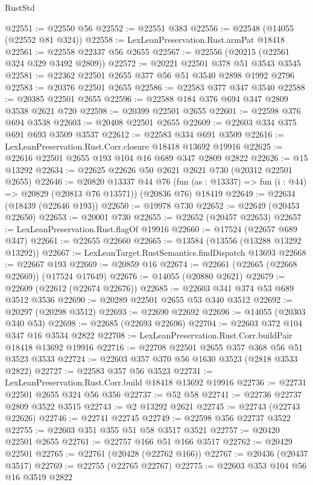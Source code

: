 \begin{lexlean}{RustStd}
\begin{coremodule}
@22551 := @22550 @56
@22552 := @22551 @383
@22556 := @22548 (@14055 (@22552 @81 @324))
@22558 := LexLeanPreservation.Rust.armPat @18418
@22561 := @22558 @22337 @56 @2655
@22567 := @22556 (@20215 (@22561 @324 @329 @3492 @2809))
@22572 := @20221 @22501 @378 @51 @3543 @3545
@22581 := @22362 @22501 @2655 @377 @56 @51 @3540 @2898 @1992 @2796
@22583 := @20376 @22501 @2655
@22586 := @22583 @377 @347 @3540
@22588 := @20385 @22501 @2655
@22596 := @22588 @184 @376 @694 @347 @2809 @3538 @2621 @720
@22598 := @20399 @22501 @2655
@22601 := @22598 @376 @694 @3538
@22603 := @20408 @22501 @2655
@22609 := @22603 @334 @375 @691 @693 @3509 @3537
@22612 := @22583 @334 @691 @3509
@22616 := LexLeanPreservation.Rust.Corr.closure @18418 @13692 @19916
@22625 := @22616 @22501 @2655 @193 @104 @16 @689 @347 @2809 @2822
@22626 := @15 @13292
@22634 := @22625 @22626 @50 @2621 @2621 @730 (@20312 @22501 @2655)
@22646 := @20820
    @13337
    @44
    @76
    (fun (as : @13337) => fun (i : @44) => @20829 (@20813 @76 @13571))
    (@20836 @76)
    @18419
@22649 := @22634 (@18439 (@22646 @193))
@22650 := @19978 @730
@22652 := @22649 (@20453 @22650)
@22653 := @20001 @730
@22655 := @22652 (@20457 @22653)
@22657 := LexLeanPreservation.Rust.flagOf @19916
@22660 := @17524 (@22657 @689 @347)
@22661 := @22655 @22660
@22665 := @13584 (@13556 (@13288 @13292 @13292))
@22667 := LexLeanTarget.RustSemantics.findDispatch @13693
@22668 := @22667 @193
@22669 := @20859 @16
@22674 := @22661 (@22665 (@22668 @22669)) (@17524 @17649)
@22676 := @14055 (@20880 @2621)
@22679 := @22609 (@22612 (@22674 @22676))
@22685 := @22603 @341 @374 @53 @689 @3512 @3536
@22690 := @20289 @22501 @2655 @53 @340 @3512
@22692 := @20297 (@20298 @3512)
@22693 := @22690 @22692
@22696 := @14055 (@20303 @340 @53)
@22698 := @22685 (@22693 @22696)
@22704 := @22603 @372 @104 @347 @16 @3534 @2822
@22708 := LexLeanPreservation.Rust.Corr.buildPair @18418 @13692 @19916
@22716 := @22708 @22501 @2655 @357 @368 @56 @51 @3523 @3533
@22724 := @22603 @357 @370 @56 @1630 @3523 (@2818 @3533 @2822)
@22727 := @22583 @357 @56 @3523
@22731 := LexLeanPreservation.Rust.Corr.build @18418 @13692 @19916
@22736 := @22731 @22501 @2655 @324 @56 @356
@22737 := @52 @58
@22741 := @22736 @22737 @2809 @3522 @3515
@22743 := @2 @13292 @2621
@22745 := @22743 (@22743 @22626)
@22746 := @22741 @22745
@22749 := @22598 @356 @22737 @3522
@22755 := @22603 @351 @355 @51 @58 @3517 @3521
@22757 := @20420 @22501 @2655
@22761 := @22757 @166 @51 @166 @3517
@22762 := @20429 @22501
@22765 := @22761 (@20428 (@22762 @166))
@22767 := @20436 (@20437 @3517)
@22769 := @22755 (@22765 @22767)
@22775 := @22603 @353 @104 @56 @16 @3519 @2822

\end{coremodule}
\end{lexlean}
